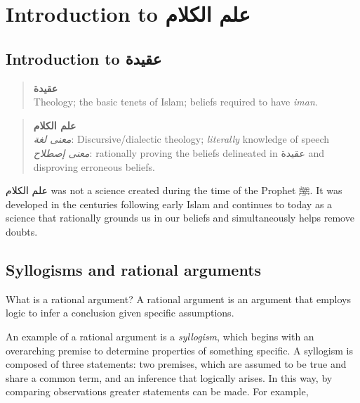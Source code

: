 \documentclass[]{book}
\begin{document}
\hypertarget{introduction-to-ux639ux644ux645-ux627ux644ux643ux644ux627ux645}{%
\section{Introduction to علم الكلام}\label{introduction-to-ux639ux644ux645-ux627ux644ux643ux644ux627ux645}}

\hypertarget{introduction-to-ux639ux642ux64aux62fux629}{%
\subsection{Introduction to عقيدة}\label{introduction-to-ux639ux642ux64aux62fux629}}

\begin{quote}
\textbf{عقيدة}\\
Theology; the basic tenets of Islam; beliefs required to have \emph{iman}.
\end{quote}

\begin{quote}
\textbf{علم الكلام}\\
\emph{معنى لغة}: Discursive/dialectic theology; \emph{literally} knowledge of speech\\
\emph{معنى إصطلاح}: rationally proving the beliefs delineated in عقيدة and disproving erroneous beliefs.
\end{quote}

علم الكلام was not a science created during the time of the Prophet ﷺ. It was developed in the centuries following early Islam and continues to today as a science that rationally grounds us in our beliefs and simultaneously helps remove doubts.

\hypertarget{syllogism}{%
\subsection{Syllogisms and rational arguments}\label{syllogism}}

What is a rational argument? A rational argument is an argument that employs logic to infer a conclusion given specific assumptions.

An example of a rational argument is a \emph{syllogism}, which begins with an overarching premise to determine properties of something specific. A syllogism is composed of three statements: two premises, which are assumed to be true and share a common term, and an inference that logically arises. In this way, by comparing observations greater statements can be made. For example,
\end{document}
